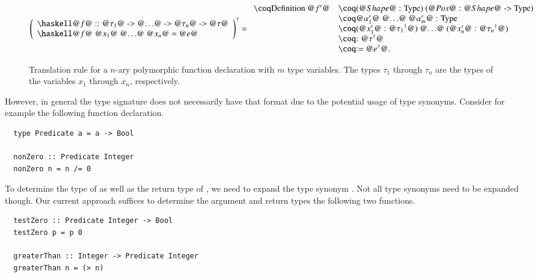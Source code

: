 \begin{figure}[H]
  \[
    \toCoq{\left(
      \begin{array}{l}
        \haskellM{@$f$@ :: @$\tau_1$@ -> @$\ldots$@ -> @$\tau_n$@ -> @$\tau$@} \\
        \haskellM{@$f$@ @$x_1$@ @$\ldots$@ @$x_n$@ = @$e$@}
      \end{array}
    \right)}
    = \begin{array}{ll}
        \coqM{Definition @$f'$@}
          &\coqM{(@$\Shape$@ : Type) (@$\Pos$@ : @$\Shape$@ -> Type)}     \\
          &\coqM{{@$\alpha_1'$@ @$\ldots$@ @$\alpha_m'$@ : Type}}         \\
          &\coqM{(@$x_1'$@ : @$\toCoqX{\tau_1}$@) @$\ldots$@ (@$x_n'$@ : @$\toCoqX{\tau_n}$@)}                                           \\
          &\coqM{: @$\toCoqX{\tau}$@}                                     \\
          &\coqM{:= @$\toCoqX{e}$@.}                                      \\
      \end{array}
  \]
  \caption{
    Translation rule for a $n$-ary polymorphic function declaration with $m$ type variables.
    The types $\tau_1$ through $\tau_n$ are the types of the variables $x_1$ through $x_n$, respectively.
  }
  \label{fig:translation:func-decl:non-rec}
\end{figure}

However, in general the type signature does not necessarily have that format due to the potential usage of type synonyms.
Consider for example the following function declaration.
\begin{verbatim}
  type Predicate a = a -> Bool

  nonZero :: Predicate Integer
  nonZero n = n /= 0
\end{verbatim}
To determine the type of  as well as the return type of , we need to expand the type synonym .
Not all type synonyms need to be expanded though.
Our current approach suffices to determine the argument and return types the following two functions.
\begin{verbatim}
  testZero :: Predicate Integer -> Bool
  testZero p = p 0

  greaterThan :: Integer -> Predicate Integer
  greaterThan n = (> n)
\end{verbatim}

